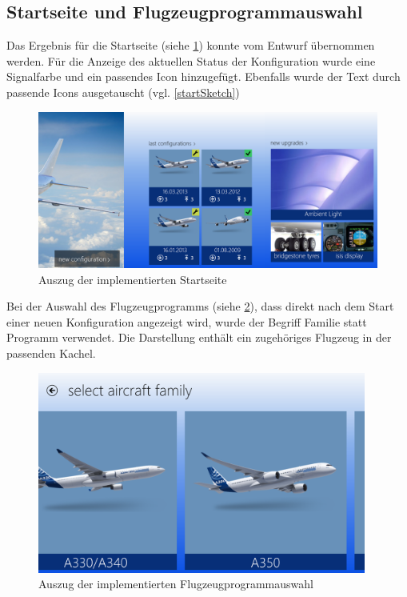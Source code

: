 \subsection{Startseite und Flugzeugprogrammauswahl}
Das Ergebnis für die Startseite (siehe \ref{startScreenImpl}) konnte vom Entwurf übernommen werden. Für die Anzeige des aktuellen Status der Konfiguration wurde eine Signalfarbe und ein passendes Icon hinzugefügt. Ebenfalls wurde der Text durch passende Icons ausgetauscht (vgl. \ref{startSketch}) 
\begin{figure}[H]
\centering
\includegraphics[width=\hsize]{images/impl/start_screen_impl}
\caption{Auszug der implementierten Startseite}
\label{startScreenImpl}
\end{figure}
Bei der Auswahl des Flugzeugprogramms (siehe \ref{aircraftProgrammImpl}), dass direkt nach dem Start einer neuen Konfiguration angezeigt wird, wurde der Begriff Familie statt Programm verwendet. Die Darstellung enthält ein zugehöriges Flugzeug  in der passenden Kachel.
\begin{figure}[H]
\centering
\includegraphics[height=250px]{images/impl/select_aircraft_family_impl}
\caption{Auszug der implementierten Flugzeugprogrammauswahl}
\label{aircraftProgrammImpl}
\end{figure}

